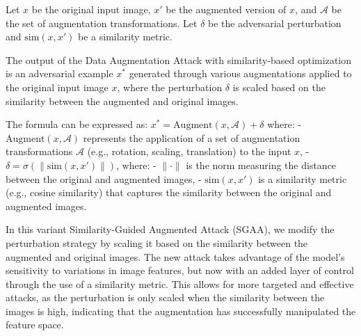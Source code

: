 Let \( x \) be the original input image, \( x' \) be the augmented version of \( x \), and \( \mathcal{A} \) be the set of augmentation transformations. Let \( \delta \) be the adversarial perturbation and \( \text{sim}(x, x') \) be a similarity metric.

The output of the Data Augmentation Attack with similarity-based optimization is an adversarial example $x^*$ generated through various augmentations applied to the original input image $x$, where the perturbation $\delta$ is scaled based on the similarity between the augmented and original images.

The formula can be expressed as:
$x^* = \text{Augment}(x, \mathcal{A}) + \delta$
where:
- $\text{Augment}(x, \mathcal{A})$ represents the application of a set of augmentation transformations $\mathcal{A}$ (e.g., rotation, scaling, translation) to the input $x$,
- $\delta = \sigma(\|\text{sim}(x, x')\|)$, where:
  - $\|\cdot\|$ is the norm measuring the distance between the original and augmented images,
  - $\text{sim}(x, x')$ is a similarity metric (e.g., cosine similarity) that captures the similarity between the original and augmented images.

In this variant Similarity-Guided Augmented Attack (SGAA), we modify the perturbation strategy by scaling it based on the similarity between the augmented and original images. The new attack takes advantage of the model's sensitivity to variations in image features, but now with an added layer of control through the use of a similarity metric. This allows for more targeted and effective attacks, as the perturbation is only scaled when the similarity between the images is high, indicating that the augmentation has successfully manipulated the feature space.